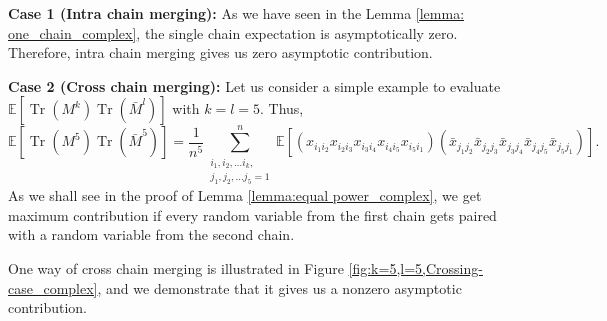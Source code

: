 \documentclass[12pt]{amsart}
\theoremstyle{plain}
\theoremstyle{definition}
\newcommand{\Tr}{\operatorname{Tr}}
\begin{document}
\textbf{Case 1 (Intra chain merging):} As we have seen in the Lemma \ref{lemma: one_chain_complex}, the single chain expectation is asymptotically zero. Therefore, intra chain merging gives us zero asymptotic contribution.




\textbf{Case 2 (Cross chain merging):}\label{case 3: cross chain merging}
Let us consider a simple example to evaluate $\mathbb{E}[\Tr(M^{k})\Tr(\bar{M}^{l})]$ with $k=l=5$.
Thus,
$$
\mathbb{E}[\Tr(M^{5})\Tr(\bar{M}^{5})] = \frac{1}{n^{5}}\sum_{\substack{i_{1},i_{2},\dots i_{k},\\  j_{1}, j_{2}, \dots j_{5}=1}}^{n} \mathbb{E}\left[(x_{i_{1}i_{2}}x_{i_{2}i_{3}}x_{i_{3}i_{4}} x_{i_{4}i_{5}}x_{i_{5}i_{1}})(\bar{x}_{j_{1}j_{2}}\bar{x}_{j_{2}j_{3}}\bar{x}_{j_{3}j_{4}}\bar{x}_{j_{4}j_{5}} \bar{x}_{j_{5}j_{1}})\right].
$$
As we shall see in the proof of Lemma \ref{lemma:equal power_complex}, we get maximum contribution if every random variable from the first chain gets paired with a random variable from the second chain.

One way of cross chain merging is illustrated in Figure \ref{fig:k=5,l=5,Crossing-case_complex}, and we demonstrate that it gives us a nonzero asymptotic contribution.
\end{document}
